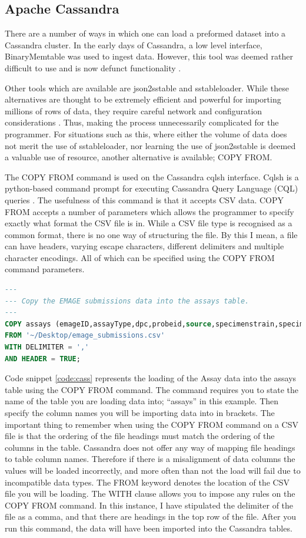 \subsection{Apache Cassandra}
There are a number of ways in which one can load a preformed dataset into a Cassandra cluster. In the early days of Cassandra, a low level interface, BinaryMemtable was used to ingest data. However, this tool was deemed rather difficult to use and is now defunct functionality \cite{cass}.

Other tools which are available are json2sstable and sstableloader. While these alternatives are thought to be extremely efficient and powerful for importing millions of rows of data, they require careful network and configuration considerations \cite{cass}. Thus, making the process unnecessarily complicated for the programmer. For situations such as this, where either the volume of data does not merit the use of sstableloader, nor learning the use of json2sstable is deemed a valuable use of resource, another alternative is available; COPY FROM.

The COPY FROM command is used on the Cassandra cqlsh interface. Cqlsh is a python-based command prompt for executing Cassandra Query Language (CQL) queries \cite{ds}. The usefulness of this command is that it accepts CSV data. COPY FROM accepts a number of parameters which allows the programmer to specify exactly what format the CSV file is in. While a CSV file type is recognised as a common format, there is no one way of structuring the file. By this I mean, a file can have headers, varying escape characters, different delimiters and multiple character encodings. All of which can be specified using the COPY FROM command parameters.

\begin{lstlisting}[language=SQL, caption=Loading data into Apache Cassandra using the cqlsh interface., label=code:cass]
---
--- Copy the EMAGE submissions data into the assays table.
---
COPY assays (emageID,assayType,dpc,probeid,source,specimenstrain,specimentype,theilerstage)
FROM '~/Desktop/emage_submissions.csv'
WITH DELIMITER = ','
AND HEADER = TRUE;
\end{lstlisting}

Code snippet \ref{code:cass} represents the loading of the Assay data into the assays table using the COPY FROM command. The command requires you to state the name of the table you are loading data into; ``assays'' in this example. Then specify the column names you will be importing data into in brackets.  The important thing to remember when using the COPY FROM command on a CSV file is that the ordering of the file headings must match the ordering of the columns in the table. Cassandra does not offer any way of mapping file headings to table column names. Therefore if there is a misalignment of data columns the values will be loaded incorrectly, and more often than not the load will fail due to incompatible data types. The FROM keyword denotes the location of the CSV file you will be loading. The WITH clause allows you to impose any rules on the COPY FROM command. In this instance, I have stipulated the delimiter of the file as a comma, and that there are headings in the top row of the file. After you run this command, the data will have been imported into the Cassandra tables.
\newpage
